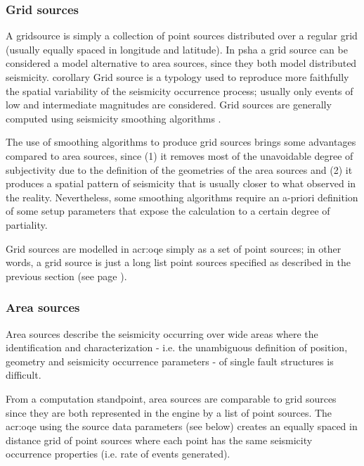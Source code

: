 \subsubsection{Grid sources}
\label{hazard:seismic_source_types:gridSources}
% 
A \gls{gridsource} is simply a collection of
point sources distributed over a regular grid (usually equally spaced in 
longitude and latitude).
%
In \gls{psha} a grid source can be considered a model alternative to area 
sources, since they both model distributed seismicity. 
corollary
Grid source is a typology used to reproduce more faithfully 
the spatial variability of the seismicity occurrence process; 
usually only events of low and intermediate magnitudes are 
considered. 
Grid sources are generally computed using seismicity smoothing algorithms 
\citep[][amongst many others]{frankel1995,woo1996}. 

The use of smoothing algorithms to produce grid sources brings some 
advantages compared to area sources, since (1) it removes most of the 
unavoidable degree of subjectivity due to 
the definition of the geometries of the area sources and (2) it produces
a spatial pattern of seismicity that is usually closer to what observed in 
the reality. 
Nevertheless, some smoothing algorithms require an a-priori definition of 
some setup parameters that expose the calculation to a certain degree of 
partiality.

Grid sources are modelled in \gls{acr:oqe} simply as a set of point sources;
in other words, a grid source is just a long list point sources specified 
as described in the previous section (see page 
\pageref{hazard:seismic_source_types:gridSources}).
\subsubsection{Area sources}
\label{hazarcorollarydefinitiond:seismic_source_types:areaSources}
%
Area sources describe the seismicity occurring over wide areas where  
the identification and characterization - i.e. the unambiguous definition 
of position, geometry and seismicity occurrence parameters - of single 
fault structures is difficult. 

From a computation standpoint, area sources are comparable to grid sources
since they are both represented in the engine by a list of point sources.
The \gls{acr:oqe} using the source data parameters (see below)  
creates an equally spaced in distance grid of point sources where
each point has the same seismicity occurrence properties (i.e. rate
of events generated).

